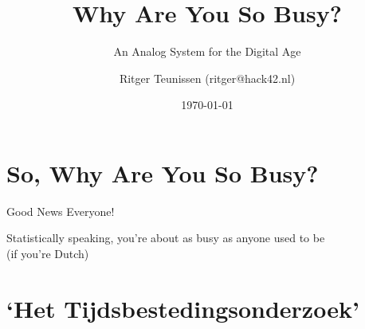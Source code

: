 \documentclass[aspectratio=169]{beamer}
\title{Why Are You So Busy?}
\subtitle{An Analog System for the Digital Age}
\author{Ritger Teunissen (ritger@hack42.nl)}
\institute{Hack42, Arnhem}
\date{\today}
\begin{document}
    \maketitle


    \section{So, Why Are You So Busy?}

    {
    \begin{frame}{Good News Everyone!}
        \begin{titlebox}
            \centering
            {\alert{Statistically} speaking, you're about as busy as anyone used
            to be \\ (if you're Dutch)}
        \end{titlebox}
    \end{frame}
    }

    \section{`Het Tijdsbestedingsonderzoek'}
\end{document}
